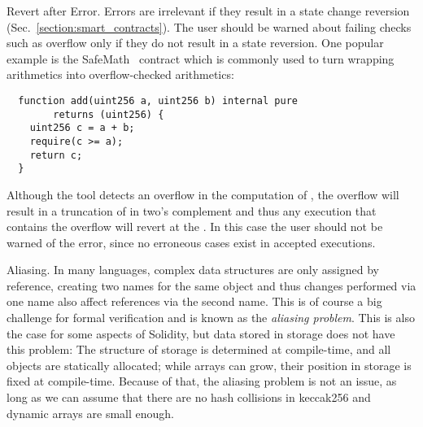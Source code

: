 \begin{paragraph}{Revert after Error.}
Errors are irrelevant if they result in a state change reversion
(Sec.~\ref{section:smart_contracts}). The user should be warned
about failing checks such as overflow only if they do not result in a state reversion.
%
One popular example is the SafeMath~\cite{SafeMath} contract which
is commonly used to turn wrapping arithmetics into overflow-checked arithmetics:

\begin{verbatim}
  function add(uint256 a, uint256 b) internal pure
        returns (uint256) {
    uint256 c = a + b;
    require(c >= a);
    return c;
  }
\end{verbatim}

Although the tool detects an overflow in the computation of ,
the overflow will result in a truncation of  in two's complement and thus
any execution that contains the overflow will revert at the .
%
In this case the user should not be warned of the error, since no erroneous cases
exist in accepted executions.
\end{paragraph}

\begin{paragraph}{Aliasing.}
In many languages, complex data structures are only assigned by
reference, creating two names for the same object and thus changes
performed via one name also affect references via the second name.
This is of course a big challenge for formal verification and
is known as the \emph{aliasing problem}.
This is also the case for some aspects of Solidity, but data stored
in storage does not have this problem: The structure of
storage is determined at compile-time, and all objects are
statically allocated; while arrays can grow, their position in
storage is fixed at compile-time. Because of that, the aliasing problem
is not an issue, as long as we can assume that there are no hash
collisions in keccak256 and dynamic arrays are small enough.
\end{paragraph}

